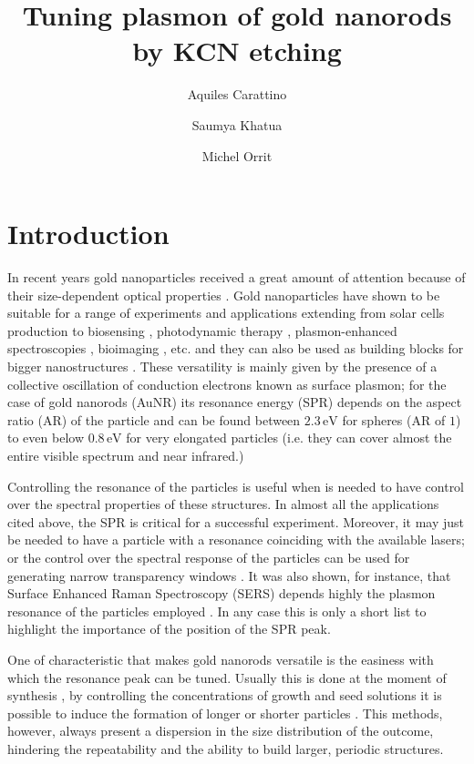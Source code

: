 \documentclass{article}
\title{Tuning plasmon of gold nanorods by KCN etching}
\author{Aquiles Carattino \and Saumya Khatua \and Michel
Orrit}
\begin{document}
\maketitle
{}

\section{Introduction}
In recent years gold nanoparticles received a great amount of attention because
of their size-dependent optical properties \cite{Zijlstra2011}. Gold
nanoparticles have shown to be suitable for a range of experiments and
applications extending from solar cells production \cite{Catchpole2008} to
biosensing \cite{Zijlstra2012}, photodynamic therapy \cite{Zhao2014},
plasmon-enhanced spectroscopies \cite{Sivapalan2013}, bioimaging
\cite{VandenBroek2013}, etc. and they can also be used as building blocks for
bigger nanostructures \cite{Ivanov2011} \cite{Do2013} \cite{Guffey2011}. These
versatility is mainly given by the presence of a collective oscillation of
conduction electrons known as surface plasmon; for the case of gold nanorods
(AuNR) its resonance energy (SPR) depends on the aspect ratio (AR) of the
particle and can be found between $2.3\,\textrm{eV}$ for spheres (AR of $1$) to
even below $0.8\,\textrm{eV}$ for very elongated particles (i.e. they can cover
almost the entire visible spectrum and near infrared.)

Controlling the resonance of the particles is useful when is needed to have
control over the spectral properties of these structures. In almost all the
applications cited above, the SPR is critical for a successful experiment.
Moreover, it may just be needed to have a particle with a resonance coinciding
with the available lasers; or the control over the spectral response of the
particles can be used for generating narrow transparency windows
\cite{Biswas2013}. It was also shown, for instance, that Surface Enhanced Raman
Spectroscopy (SERS) depends highly the plasmon resonance of the particles
employed \cite{Sivapalan2013}. In any case this is only a short list to
highlight the importance of the position of the SPR peak.

One of characteristic that makes gold nanorods versatile is the easiness with
which the resonance peak can be tuned. Usually this is done at the moment of
synthesis \cite{Gou2005}, by controlling the concentrations of growth and seed
solutions it is possible to induce the formation of longer or shorter particles
\cite{Nikoobakht2003}. This methods, however, always present a dispersion in the
size distribution of the outcome, hindering the repeatability and the ability to
build larger, periodic structures.
\end{document}
